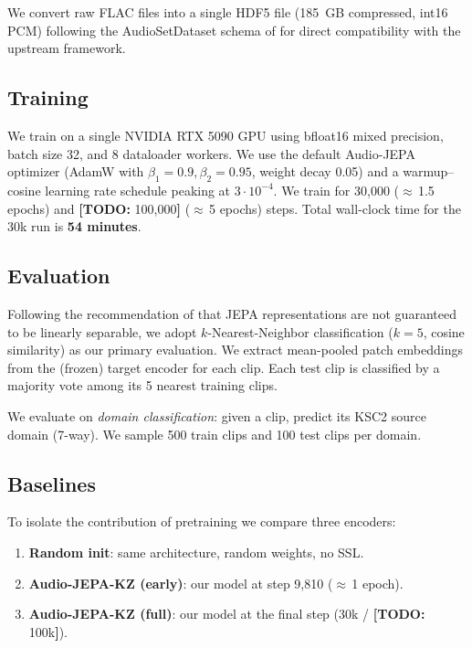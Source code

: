 \documentclass[conference]{IEEEtran}
\newcommand{\todo}[1]{{\color{red}\textbf{[TODO:} #1\textbf{]}}}
\begin{document}
We convert raw FLAC files into a single HDF5 file (185~GB compressed, int16 PCM) following the AudioSetDataset schema of \cite{tuncay2025audiojepa} for direct compatibility with the upstream framework.

\subsection{Training}

We train on a single NVIDIA RTX 5090 GPU using bfloat16 mixed precision, batch size 32, and 8 dataloader workers. We use the default Audio-JEPA optimizer (AdamW with $\beta_1=0.9,\beta_2=0.95$, weight decay 0.05) and a warmup--cosine learning rate schedule peaking at $3 \cdot 10^{-4}$. We train for 30{,}000 ($\approx$\,1.5 epochs) and \todo{100{,}000} ($\approx$\,5 epochs) steps. Total wall-clock time for the 30k run is \textbf{54 minutes}.

\subsection{Evaluation}

Following the recommendation of \cite{tuncay2025audiojepa} that JEPA representations are not guaranteed to be linearly separable, we adopt $k$-Nearest-Neighbor classification ($k=5$, cosine similarity) as our primary evaluation. We extract mean-pooled patch embeddings from the (frozen) target encoder for each clip. Each test clip is classified by a majority vote among its 5 nearest training clips.

We evaluate on \emph{domain classification}: given a clip, predict its KSC2 source domain (7-way). We sample 500 train clips and 100 test clips per domain.

\subsection{Baselines}

To isolate the contribution of pretraining we compare three encoders:
\begin{enumerate}
    \item \textbf{Random init}: same architecture, random weights, no SSL.
    \item \textbf{Audio-JEPA-KZ (early)}: our model at step 9{,}810 ($\approx$\,1 epoch).
    \item \textbf{Audio-JEPA-KZ (full)}: our model at the final step (30k / \todo{100k}).
\end{enumerate}
\end{document}
